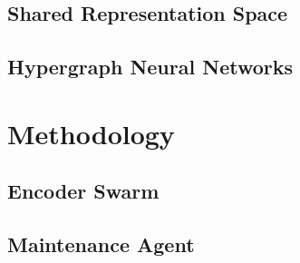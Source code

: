 \documentclass[12pt, a4paper]{article}
\begin{document}
\subsection{Shared Representation Space}

\subsection{Hypergraph Neural Networks}

\section{Methodology}
\label{sec:methodology}


\subsection{Encoder Swarm}


\subsection{Maintenance Agent}

\end{document}
